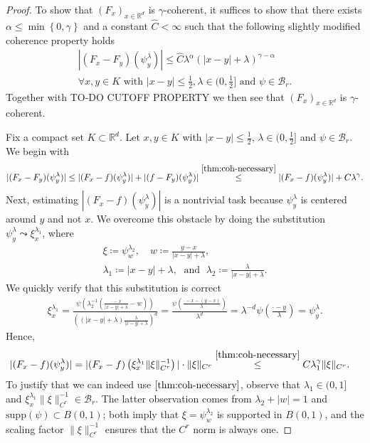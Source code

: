 \begin{proof}
   To show that $(F_x)_{x \in \mathbb{R}^d}$ is $\gamma$-coherent, it suffices to show that there exists $\alpha \leq \min\left\{ 0, \gamma \right\}$ and a constant $\hat C < \infty$ such that the following slightly modified coherence property holds 
   \begin{gather*}
       |(F_x - F_y)(\psi^\lambda_y)| \leq \hat C \lambda^\alpha(|x-y| + \lambda)^{ \gamma - \alpha} \\
       \text{$\forall x,y \in K$ with $|x-y| \leq \frac{1}{2}, \lambda \in (0, \frac{1}{2}]$ and $\psi \in \mathcal{B}_r$}.
   \end{gather*}  
   Together with TO-DO CUTOFF PROPERTY we then see that $(F_x)_{x \in \mathbb{R}^d}$ is $\gamma$-coherent.  

   Fix a compact set $K \subset \mathbb{R}^d$. Let $x,y \in K$ with $|x-y| \leq \frac{1}{2}$, $\lambda \in (0, \frac{1}{2}]$ and $\psi \in \mathcal{B}_r$. We begin with
   \begin{align*}
    |(F_x - F_y)(\psi^\lambda_y)| \leq |(F_x - f)(\psi^\lambda_y)| + |(f - F_y)(\psi^\lambda_y)| \overset{\eqref{thm:coh-necessary}}{\leq} |(F_x - f)(\psi^\lambda_y)| + C \lambda^\gamma.
   \end{align*}
   Next, estimating $|(F_x - f)(\psi^\lambda_y)|$ is a nontrivial task because $\psi_y^\lambda$ is centered around $y$ and not $x$. We overcome this obstacle by doing the substitution $\psi^\lambda_y \leadsto \xi^{\lambda_1}_x$, where 
   \begin{gather*}
       \xi \coloneqq \psi^{\lambda_2}_w, \quad w \coloneqq \frac{y-x}{|x-y| + \lambda}, \\
    \lambda_1 \coloneqq |x-y| + \lambda, \;\text{ and } \; \lambda_2 \coloneqq \frac{\lambda}{|x-y|  + \lambda}.
   \end{gather*}
   We quickly verify that this substitution is correct
   \begin{align*}
    \xi^{\lambda_1}_x = \frac{\psi\left(
        \lambda_2^{-1}\left(\frac{\cdot - x}{|x-y| + \lambda} - w\right)
    \right) }{\left((|x-y| + \lambda)\frac{\lambda}{|x-y| + \lambda}\right)^d}
    =
    \frac{\psi\left(
        \frac{\cdot - x - (y-x)}{\lambda}
    \right) }{\lambda^d} = \lambda^{-d}\psi\left( \frac{\cdot - y}{\lambda} \right) = \psi^\lambda_{y}.
   \end{align*}
   Hence, 
   \begin{align}
    |(F_x - f)(\psi^\lambda_y)| = |(F_x - f)\left( \xi^{\lambda_1}_x \lVert \xi \rVert_{C^{r}}^{-1} \right)| \cdot  \lVert \xi \rVert_{C^{r}} &\overset{\eqref{thm:coh-necessary}}{\leq} C\lambda_1^\gamma\lVert \xi \rVert_{C^{r}}. \label{SponsoredByGilette}
   \end{align}
   To justify that we can indeed use $\eqref{thm:coh-necessary}$, observe that $\lambda_1 \in (0, 1]$ and $\xi^{\lambda_1}_x \lVert \xi \rVert_{C^{r}}^{-1} \in \mathcal{B}_{r}$. The latter observation comes from $\lambda_2 + |w| = 1$ and $\mathrm{supp}(\psi) \subset B(0,1)$; both imply that $\xi = \psi^{\lambda_2}_w$ is supported in $B(0,1)$, and the scaling factor $\lVert \xi \rVert_{C^{r}}^{-1}$ ensures that the $C^r$ norm is always one.
   

\end{proof}
